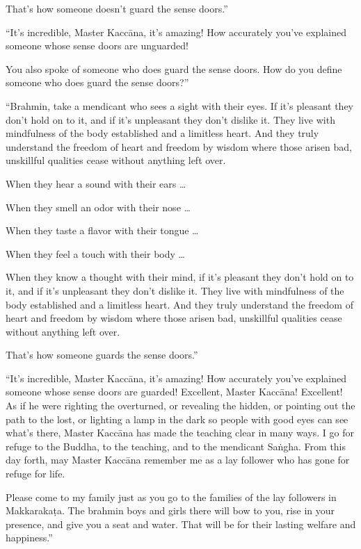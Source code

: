 \documentclass[12pt,openany]{book}%
\begin{document}
That’s how someone doesn’t guard the sense doors.” 

“It’s incredible, Master \textsanskrit{Kaccāna}, it’s amazing! How accurately you’ve explained someone whose sense doors are unguarded! 

You also spoke of someone who does guard the sense doors. How do you define someone who does guard the sense doors?” 

“Brahmin, take a mendicant who sees a sight with their eyes. If it’s pleasant they don’t hold on to it, and if it’s unpleasant they don’t dislike it. They live with mindfulness of the body established and a limitless heart. And they truly understand the freedom of heart and freedom by wisdom where those arisen bad, unskillful qualities cease without anything left over. 

When they hear a sound with their ears … 

When they smell an odor with their nose … 

When they taste a flavor with their tongue … 

When they feel a touch with their body … 

When they know a thought with their mind, if it’s pleasant they don’t hold on to it, and if it’s unpleasant they don’t dislike it. They live with mindfulness of the body established and a limitless heart. And they truly understand the freedom of heart and freedom by wisdom where those arisen bad, unskillful qualities cease without anything left over. 

That’s how someone guards the sense doors.” 

“It’s incredible, Master \textsanskrit{Kaccāna}, it’s amazing! How accurately you’ve explained someone whose sense doors are guarded! Excellent, Master \textsanskrit{Kaccāna}! Excellent! As if he were righting the overturned, or revealing the hidden, or pointing out the path to the lost, or lighting a lamp in the dark so people with good eyes can see what’s there, Master \textsanskrit{Kaccāna} has made the teaching clear in many ways. I go for refuge to the Buddha, to the teaching, and to the mendicant \textsanskrit{Saṅgha}. From this day forth, may Master \textsanskrit{Kaccāna} remember me as a lay follower who has gone for refuge for life. 

Please come to my family just as you go to the families of the lay followers in \textsanskrit{Makkarakaṭa}. The brahmin boys and girls there will bow to you, rise in your presence, and give you a seat and water. That will be for their lasting welfare and happiness.” 
\end{document}
